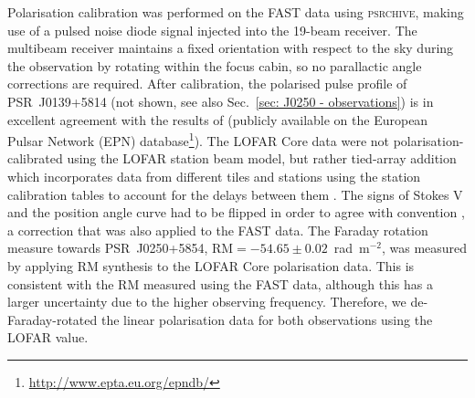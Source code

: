 Polarisation calibration was performed on the FAST data using \textsc{psrchive}, making use of a pulsed noise diode signal injected into the 19-beam receiver. The multibeam receiver maintains a fixed orientation with respect to the sky during the observation by rotating within the focus cabin, so no parallactic angle corrections are required. After calibration, the polarised pulse profile of PSR~J0139+5814 (not shown, see also Sec.~\ref{sec: J0250 - observations}) is in excellent agreement with the results of \citet{GLxx1998} (publicly available on the European Pulsar Network (EPN) database\footnote{\url{http://www.epta.eu.org/epndb/}}). The LOFAR Core data were not polarisation-calibrated using the LOFAR station beam model, but rather tied-array addition which incorporates data from different tiles and stations using the station calibration tables to account for the delays between them \citep[more detail can be found in ][]{SBG+2019}. The signs of Stokes V and the position angle curve had to be flipped in order to agree with convention \citep[e.g.][]{EWxx2001}, a correction that was also applied to the FAST data. The Faraday rotation measure towards PSR~J0250+5854, $\mathrm{RM}=-54.65\pm0.02$~rad~m$^{-2}$, was measured by applying RM synthesis \citep{BBxx2005} to the LOFAR Core polarisation data. This is consistent with the RM measured using the FAST data, although this has a larger uncertainty due to the higher observing frequency. Therefore, we de-Faraday-rotated the linear polarisation data for both observations using the LOFAR value.

